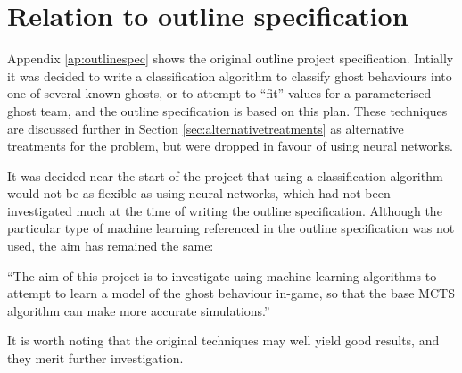 \section{Relation to outline specification}
\label{sec:relationoutlinespec}

Appendix \ref{ap:outlinespec} shows the original outline project specification.  Intially it was decided to write a classification algorithm to classify ghost behaviours into one of several known ghosts, or to attempt to ``fit'' values for a parameterised ghost team, and the outline specification is based on this plan.  These techniques are discussed further in Section \ref{sec:alternativetreatments} as alternative treatments for the problem, but were dropped in favour of using neural networks.

It was decided near the start of the project that using a classification algorithm would not be as flexible as using neural networks, which had not been investigated much at the time of writing the outline specification.  Although the particular type of machine learning referenced in the outline specification was not used, the aim has remained the same:

``The aim of this project is to investigate using machine learning algorithms to attempt to learn a model of the ghost behaviour in-game, so that the base MCTS algorithm can make more accurate simulations.''

It is worth noting that the original techniques may well yield good results, and they merit further investigation.

